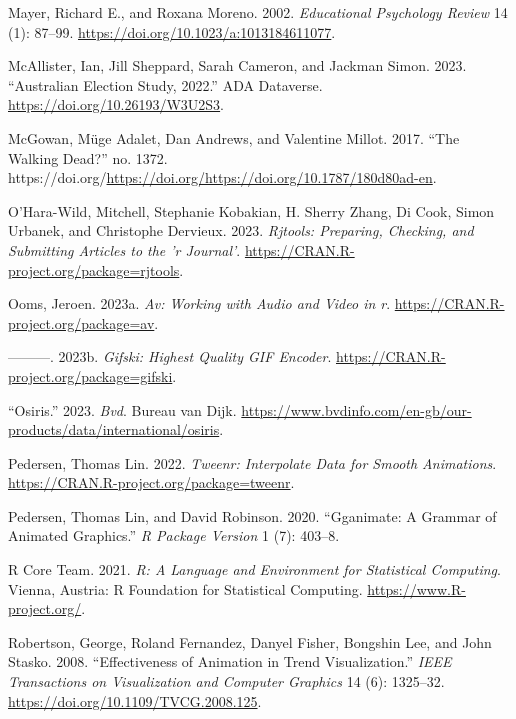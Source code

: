 \begin{CSLReferences}{1}{0}
\leavevmode{}%
Mayer, Richard E., and Roxana Moreno. 2002. \emph{Educational Psychology Review} 14 (1): 87--99. \url{https://doi.org/10.1023/a:1013184611077}.

\leavevmode{}%
McAllister, Ian, Jill Sheppard, Sarah Cameron, and Jackman Simon. 2023. {``Australian Election Study, 2022.''} ADA Dataverse. \url{https://doi.org/10.26193/W3U2S3}.

\leavevmode{}%
McGowan, Müge Adalet, Dan Andrews, and Valentine Millot. 2017. {``The Walking Dead?''} no. 1372. https://doi.org/\url{https://doi.org/https://doi.org/10.1787/180d80ad-en}.

\leavevmode{}%
O'Hara-Wild, Mitchell, Stephanie Kobakian, H. Sherry Zhang, Di Cook, Simon Urbanek, and Christophe Dervieux. 2023. \emph{Rjtools: Preparing, Checking, and Submitting Articles to the 'r Journal'}. \url{https://CRAN.R-project.org/package=rjtools}.

\leavevmode{}%
Ooms, Jeroen. 2023a. \emph{Av: Working with Audio and Video in r}. \url{https://CRAN.R-project.org/package=av}.

\leavevmode{}%
---------. 2023b. \emph{Gifski: Highest Quality GIF Encoder}. \url{https://CRAN.R-project.org/package=gifski}.

\leavevmode{}%
{``Osiris.''} 2023. \emph{Bvd}. Bureau van Dijk. \url{https://www.bvdinfo.com/en-gb/our-products/data/international/osiris}.

\leavevmode{}%
Pedersen, Thomas Lin. 2022. \emph{Tweenr: Interpolate Data for Smooth Animations}. \url{https://CRAN.R-project.org/package=tweenr}.

\leavevmode{}%
Pedersen, Thomas Lin, and David Robinson. 2020. {``Gganimate: A Grammar of Animated Graphics.''} \emph{R Package Version} 1 (7): 403--8.

\leavevmode{}%
R Core Team. 2021. \emph{R: A Language and Environment for Statistical Computing}. Vienna, Austria: R Foundation for Statistical Computing. \url{https://www.R-project.org/}.

\leavevmode{}%
Robertson, George, Roland Fernandez, Danyel Fisher, Bongshin Lee, and John Stasko. 2008. {``Effectiveness of Animation in Trend Visualization.''} \emph{IEEE Transactions on Visualization and Computer Graphics} 14 (6): 1325--32. \url{https://doi.org/10.1109/TVCG.2008.125}.


\end{CSLReferences}
